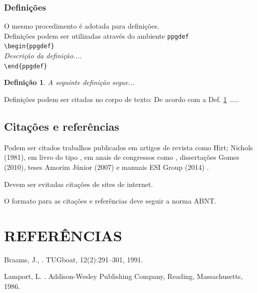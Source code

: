 \documentclass[a4paper,12pt,oneside]{article}
\numberwithin{equation}{section}
\newtheorem{ppgdef}{Definição}[section]
\begin{document}
\subsubsection{Definições}

O mesmo procedimento é adotada para definições.\\


Definições podem ser utilizadas através do ambiente \texttt{ppgdef}\\

\noindent \texttt{\textbackslash begin\{ppgdef\}}\\
\textit{Descrição da definição....}\\
\texttt{\textbackslash end\{ppgdef\}}

\begin{ppgdef}
A seguinte definição segue...
\label{def1}
\end{ppgdef}

Definições podem ser citadas no corpo de texto: De acordo com a Def. \ref{def1}  .....
	
	
\subsection{Citações e referências}

Podem ser citados trabalhos publicados em artigos de revista como Hirt; Nichols (1981), em livro do tipo \citep{Lamport:LaTeX}, em anais de congressos como \citet{braams:babel}, dissertações Gomes (2010), teses Amorim Júnior (2007) e manuais ESI Group (2014) .

Devem ser evitadas citações de sites de internet.

O formato para as citações e referências deve seguir a norma ABNT.




\section{REFERÊNCIAS}

\begingroup
\renewcommand{\section}[2]{}%
\begin{thebibliography}{1}

Braams, J., . \newblock TUGboat, 12(2):291--301, 1991.

Lamport, L. . \newblock Addison-Wesley Publishing Company, Reading, Massachusetts, 1986.

\end{thebibliography}
\endgroup
\end{document}
